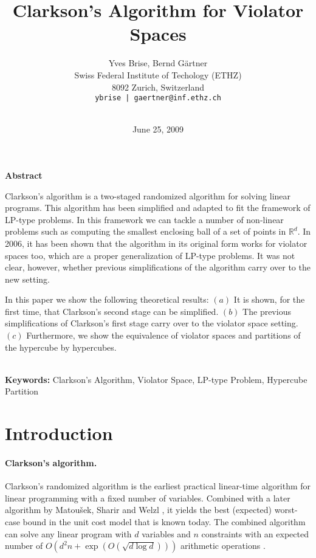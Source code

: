 \documentclass[12pt]{article}
\theoremstyle{remark}
\begin{document}
\date{June 25, 2009}
\title{Clarkson's Algorithm for Violator Spaces}
\author{Yves Brise, Bernd G\"artner\\
{\small Swiss Federal Institute of Techology (ETHZ)}\\{\small 8092 Zurich, Switzerland}\\{\small 
\texttt{ybrise | gaertner@inf.ethz.ch}}\\\\
}

\maketitle
\begin{center}
	\textbf{Abstract}\\
\end{center}
Clarkson's algorithm is a two-staged randomized algorithm for solving linear programs. 
This algorithm has been simplified and adapted to fit the framework of LP-type problems. In this
framework we can tackle a number of non-linear problems such as computing the smallest
enclosing ball of a set of points in $\mathbb{R}^d$.
In 2006, it has been shown that the algorithm in its original form works for violator spaces too, which 
are a proper
generalization of LP-type problems. It was not clear, however, whether previous simplifications of the 
algorithm carry over to the new setting.


In this paper we show the following theoretical results: $(a)$ It is shown, for the first time, that Clarkson's
second stage can be simplified.  $(b)$ The previous simplifications of Clarkson's first stage carry
over to the violator space setting.  
$(c)$ Furthermore, we show the equivalence of violator spaces and partitions of the hypercube by hypercubes.

~\\
\textbf{Keywords:} Clarkson's Algorithm, Violator Space, LP-type Problem, Hypercube Partition



\section{Introduction}
\paragraph{Clarkson's algorithm.}
Clarkson's randomized algorithm \cite{c-lvali-95} is the earliest
practical linear-time algorithm for linear programming with a fixed
number of variables.  Combined with a later algorithm by Matou{\v{s}}ek,
Sharir and Welzl \cite{MSW}, it yields the best (expected) worst-case
bound in the unit cost model that is known today.  The combined
algorithm can solve any linear program with $d$ variables and $n$
constraints with an expected number of $O(d^2 n + \exp(O(\sqrt{d\log
  d})))$ arithmetic operations \cite{GaerWel1}.
\end{document}
